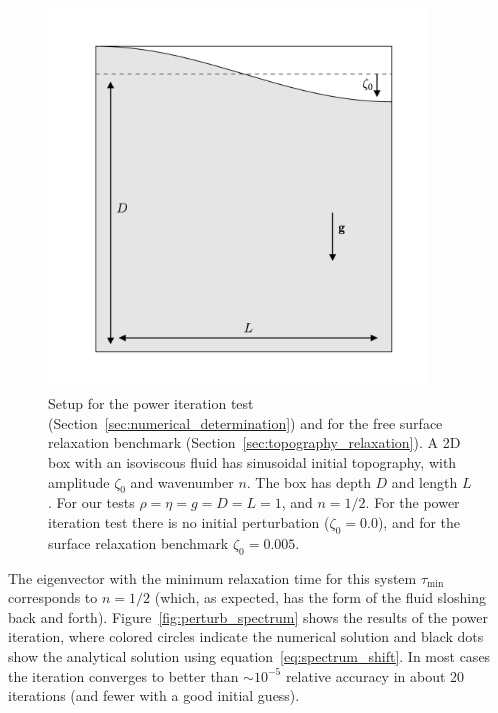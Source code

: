 \documentclass[preprint,12pt,authoryear]{elsarticle}
\begin{document}
\begin{figure}
\includegraphics[width=0.9\textwidth]{figures/benchmark_setup.pdf}
\caption{Setup for the power iteration test (Section~\ref{sec:numerical_determination}) and for the free surface relaxation benchmark (Section~\ref{sec:topography_relaxation}). A 2D box with an isoviscous fluid has sinusoidal initial topography, with amplitude $\zeta_0$ and wavenumber $n$. The box has depth $D$ and length $L$. For our tests $\rho = \eta = g = D = L = 1$, and $n=1/2$. For the power iteration test there is no initial perturbation ($\zeta_0 = 0.0$), and for the surface relaxation benchmark $\zeta_0 = 0.005$.}
\label{fig:benchmark_setup}
\end{figure}
The eigenvector with the minimum relaxation time for this system $\tau_{\min}$ corresponds to $n=1/2$ 
(which, as expected, has the form of the fluid sloshing back and forth).
Figure~\ref{fig:perturb_spectrum} shows the results of the power iteration, where colored circles indicate the numerical
solution and black dots show the analytical solution using equation~\eqref{eq:spectrum_shift}.
In most cases the iteration converges to better than $\sim10^{-5}$ relative accuracy in about 20 iterations
(and fewer with a good initial guess).
\end{document}
